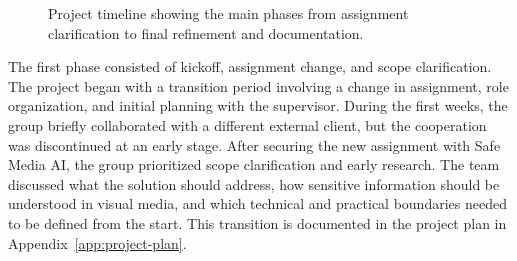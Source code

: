 \begin{figure}[H]
\centering
{}
\caption{Project timeline showing the main phases from assignment clarification to final refinement and documentation.}
\label{fig:project-timeline}
\end{figure}

The first phase consisted of kickoff, assignment change, and scope clarification. The project began with a transition period involving a change in assignment, role organization, and initial planning with the supervisor. During the first weeks, the group briefly collaborated with a different external client, but the cooperation was discontinued at an early stage. After securing the new assignment with Safe Media AI, the group prioritized scope clarification and early research. The team discussed what the solution should address, how sensitive information should be understood in visual media, and which technical and practical boundaries needed to be defined from the start. This transition is documented in the project plan in Appendix~\ref{app:project-plan}.

